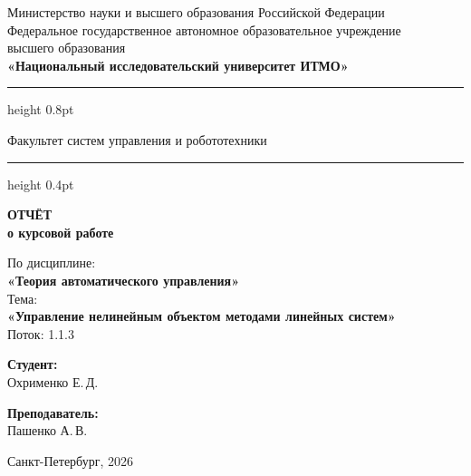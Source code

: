 \documentclass[a4paper,12pt]{article}
\begin{document}
	
	\begin{titlepage}
		\centering
		
		\vspace*{0.5cm}
		{\small
			Министерство науки и высшего образования Российской Федерации\\[2pt]
			Федеральное государственное автономное образовательное учреждение\\
			высшего образования\\[2pt]
			\textbf{«Национальный исследовательский университет ИТМО»}\\
		}
		
		\vspace{0.8cm}
		\hrule height 0.8pt
		\vspace{0.3cm}
		
		{\large Факультет систем управления и робототехники}
		
		\vspace{0.3cm}
		\hrule height 0.4pt
		
		\vspace{2.5cm}
		
		{\Huge\bfseries ОТЧЁТ}\\[0.4cm]
		{\LARGE\bfseries о курсовой работе}\\[0.8cm]
		
		\begin{tcolorbox}[
			colback=gray!4,
			colframe=gray!10,
			boxrule=0.8pt,
			arc=4pt,
			left=12pt, right=12pt, top=8pt, bottom=8pt
			]
			\centering
			{\large По дисциплине:\\[4pt]}
			{\large\bfseries «Теория автоматического управления»}\\[10pt]
			{\large Тема:\\[4pt]}
			{\large\bfseries «Управление нелинейным объектом методами линейных систем»} \\[10pt]
			{\large Поток: 1.1.3}
		\end{tcolorbox}
		
		\vspace{3cm}
		
		\begin{minipage}{0.45\textwidth}
			\raggedright
			{\large\bfseries Студент:}\\[4pt]
			Охрименко Е.\,Д.\\
		\end{minipage}
		\hfill
		\begin{minipage}{0.45\textwidth}
			\raggedleft
			{\large\bfseries Преподаватель:}\\[4pt]
			Пашенко А.\,В.\\
		\end{minipage}
		
		\vfill
		
		
		\vspace{0.4cm}
		
		{\large Санкт-Петербург, 2026}
		
	\end{titlepage}
	
\end{document}
